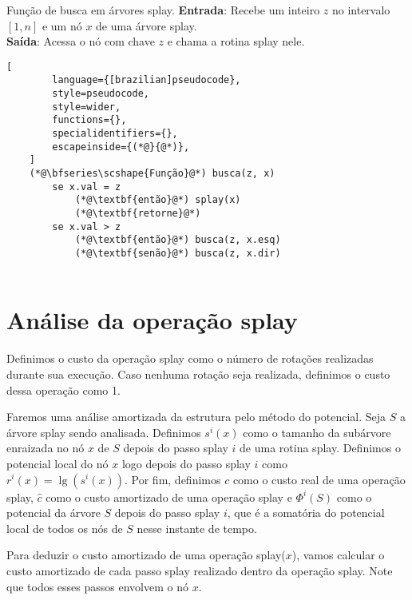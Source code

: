 \begin{programruledcaption}{Função de busca em árvores splay.\label{prog:busca}}
    \noindent\textbf{Entrada}: Recebe um inteiro $z$ no intervalo $[1,n]$ e um nó $x$ de uma árvore splay.\\
    \textbf{Saída}: Acessa o nó com chave $z$ e chama a rotina splay nele.
    \vspace{-0.5\baselineskip}
    \begin{lstlisting}[
        language={[brazilian]pseudocode},
        style=pseudocode,
        style=wider,
        functions={},
        specialidentifiers={},
        escapeinside={(*@}{@*)},
    ]
    (*@\bfseries\scshape{Função}@*) busca(z, x)
        se x.val = z
            (*@\textbf{então}@*) splay(x)
            (*@\textbf{retorne}@*)
        se x.val > z
            (*@\textbf{então}@*) busca(z, x.esq)
            (*@\textbf{senão}@*) busca(z, x.dir)
        
    \end{lstlisting}
    \vspace{-0.5\baselineskip}
\end{programruledcaption}

\section{Análise da operação splay}

Definimos o custo da operação splay como o número de rotações realizadas durante sua execução. Caso nenhuma rotação seja realizada, definimos o custo dessa operação como 1. 

Faremos uma análise amortizada da estrutura pelo método do potencial. Seja $S$ a árvore splay sendo analisada. Definimos $s^{i}(x)$ como o tamanho da subárvore enraizada no nó $x$ de $S$ depois do passo splay $i$ de uma rotina splay. Definimos o potencial local do nó $x$ logo depois do passo splay $i$ como $r^{i}(x) = \lg(s^{i}(x))$. Por fim, definimos $c$ como o custo real de uma operação splay, \( \hat{c}\) como o custo amortizado de uma operação splay e $\Phi^{i}(S)$ como o potencial da árvore $S$ depois do passo splay $i$, que é a somatória do potencial local de todos os nós de $S$ nesse instante de tempo.

Para deduzir o custo amortizado de uma operação splay($x$), vamos calcular o custo amortizado de cada passo splay realizado dentro da operação splay. Note que todos esses passos envolvem o nó $x$.

